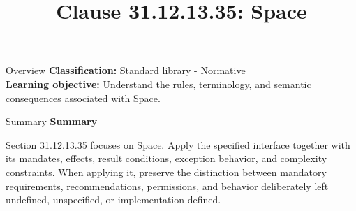 \documentclass[10pt,letterpaper]{article}
\title{Clause 31.12.13.35: Space}
\author{}
\date{}
\begin{document}
\maketitle
\begin{CornellOverviewBox}{Overview}
\textbf{Classification:} Standard library - Normative\\[2pt]
\textbf{Learning objective:} Understand the rules, terminology, and semantic consequences associated with Space.
\end{CornellOverviewBox}\begin{CornellSummaryBox}{Summary}
{\sffamily\bfseries\color{Accent} Summary}\par\vspace{3pt}Section 31.12.13.35 focuses on Space. Apply the specified interface together with its mandates, effects, result conditions, exception behavior, and complexity constraints. When applying it, preserve the distinction between mandatory requirements, recommendations, permissions, and behavior deliberately left undefined, unspecified, or implementation-defined.
\end{CornellSummaryBox}
\end{document}
